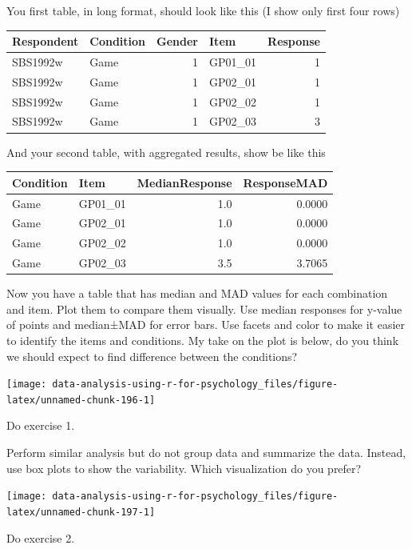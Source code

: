 \documentclass[
]{book}
\begin{document}
You first table, in long format, should look like this (I show only first four rows)

\begin{tabular}{l|l|r|l|r}
\hline
Respondent & Condition & Gender & Item & Response\\
\hline
SBS1992w & Game & 1 & GP01\_01 & 1\\
\hline
SBS1992w & Game & 1 & GP02\_01 & 1\\
\hline
SBS1992w & Game & 1 & GP02\_02 & 1\\
\hline
SBS1992w & Game & 1 & GP02\_03 & 3\\
\hline
\end{tabular}

And your second table, with aggregated results, show be like this

\begin{tabular}{l|l|r|r}
\hline
Condition & Item & MedianResponse & ResponseMAD\\
\hline
Game & GP01\_01 & 1.0 & 0.0000\\
\hline
Game & GP02\_01 & 1.0 & 0.0000\\
\hline
Game & GP02\_02 & 1.0 & 0.0000\\
\hline
Game & GP02\_03 & 3.5 & 3.7065\\
\hline
\end{tabular}

Now you have a table that has median and MAD values for each combination and item. Plot them to compare them visually. Use median responses for y-value of points and median±MAD for error bars. Use facets and color to make it easier to identify the items and conditions. My take on the plot is below, do you think we should expect to find difference between the conditions?

\begin{center}\texttt{[image: data-analysis-using-r-for-psychology\_files/figure-latex/unnamed-chunk-196-1]} \end{center}

Do exercise 1.

Perform similar analysis but do not group data and summarize the data. Instead, use box plots to show the variability. Which visualization do you prefer?

\begin{center}\texttt{[image: data-analysis-using-r-for-psychology\_files/figure-latex/unnamed-chunk-197-1]} \end{center}

Do exercise 2.
\end{document}
